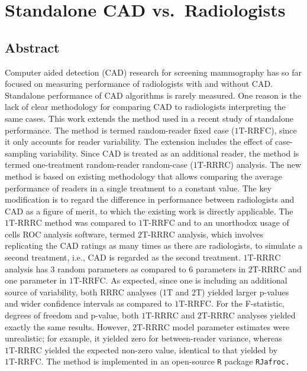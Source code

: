 \documentclass[
]{article}
\author{}
\date{\vspace{-2.5em}}
\begin{document}
{
\setcounter{tocdepth}{2}
\tableofcontents
}
\hypertarget{standalone-cad-radiologists}{%
\section{Standalone CAD vs.~Radiologists}\label{standalone-cad-radiologists}}

\hypertarget{standalone-cad-radiologists-abstract}{%
\subsection{Abstract}\label{standalone-cad-radiologists-abstract}}

Computer aided detection (CAD) research for screening mammography has so far focused on measuring performance of radiologists with and without CAD. Standalone performance of CAD algorithms is rarely measured. One reason is the lack of clear methodology for comparing CAD to radiologists interpreting the same cases. This work extends the method used in a recent study of standalone performance. The method is termed random-reader fixed case (\(\text{1T-RRFC}\)), since it only accounts for reader variability. The extension includes the effect of case-sampling variability. Since CAD is treated as an additional reader, the method is termed one-treatment random-reader random-case (\(\text{1T-RRRC}\)) analysis. The new method is based on existing methodology that allows comparing the average performance of readers in a single treatment to a constant value. The key modification is to regard the difference in performance between radiologists and CAD as a figure of merit, to which the existing work is directly applicable. The \(\text{1T-RRRC}\) method was compared to \(\text{1T-RRFC}\) and to an unorthodox usage of cells ROC analysis software, termed \(\text{2T-RRRC}\) analysis, which involves replicating the CAD ratings as many times as there are radiologists, to simulate a second treatment, i.e., CAD is regarded as the second treatment. \(\text{1T-RRRC}\) analysis has 3 random parameters as compared to 6 parameters in \(\text{2T-RRRC}\) and one parameter in \(\text{1T-RRFC}\). As expected, since one is including an additional source of variability, both RRRC analyses (1T and 2T) yielded larger p-values and wider confidence intervals as compared to \(\text{1T-RRFC}\). For the F-statistic, degrees of freedom and p-value, both \(\text{1T-RRRC}\) and \(\text{2T-RRRC}\) analyses yielded exactly the same results. However, \(\text{2T-RRRC}\) model parameter estimates were unrealistic; for example, it yielded zero for between-reader variance, whereas \(\text{1T-RRRC}\) yielded the expected non-zero value, identical to that yielded by \(\text{1T-RRFC}\). The method is implemented in an open-source \texttt{R} package \texttt{RJafroc.}
\end{document}
